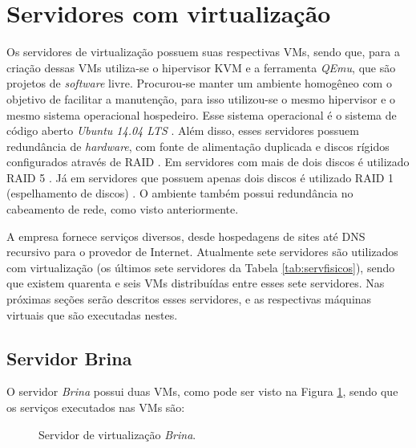 \section{Servidores com virtualização}
\label{section:servvirt}

Os servidores de virtualização possuem suas respectivas \ac{VM}s, sendo que, para a criação dessas \ac{VM}s utiliza-se o hipervisor \ac{KVM} 
\cite{kvm} e a ferramenta \textit{QEmu}, que são projetos de \textit{software} livre. Procurou-se manter um ambiente homogêneo com o objetivo de 
facilitar a manutenção, para isso utilizou-se o mesmo hipervisor e o mesmo sistema operacional hospedeiro. Esse sistema operacional é o sistema 
de código aberto \textit{Ubuntu 14.04 \ac{LTS}} \cite{ubuntu}. Além disso, esses servidores possuem redundância de \textit{hardware}, com fonte 
de alimentação duplicada e discos rígidos configurados através de \ac{RAID} \cite{raid}. Em servidores com mais de dois discos é utilizado 
\ac{RAID} 5 \cite{raid}. Já em servidores que possuem apenas dois discos é utilizado \ac{RAID} 1 (espelhamento de discos) \cite{raid}. 
O ambiente também possui redundância no cabeamento de rede, como visto anteriormente.

A empresa fornece serviços diversos, desde hospedagens de sites até \ac{DNS} recursivo para o provedor de Internet. Atualmente sete servidores 
são utilizados com virtualização (os últimos sete servidores da Tabela \ref{tab:servfisicos}), sendo que existem quarenta e seis \ac{VM}s 
distribuídas entre esses sete servidores. Nas próximas seções serão descritos esses servidores, e as respectivas máquinas virtuais que são
executadas nestes.

\subsection{Servidor Brina}
\label{section:serv_brina}

O servidor \textit{Brina} possui duas \ac{VM}s, como pode ser visto na Figura \ref{fig:servidor_brina}, sendo que os serviços executados nas 
\ac{VM}s são:

\begin{figure}[h!]
 \centering
 \caption{Servidor de virtualização \textit{Brina}.}
 \label{fig:servidor_brina}
\end{figure}

